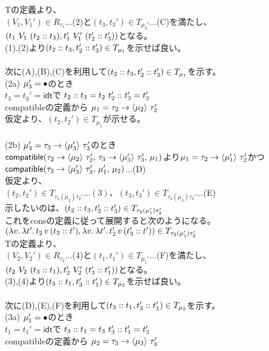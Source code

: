 Tの定義より、\\
$(V_1,V_1')\in R_{\tau_1}$...(2)と$(t_3,t_3')\in T_{\mu_3'}$...(C)を満たし、$(t_1\ V_1\ (\Cons{t_2}{t_3}),t_1'\ V_1'\ (\Cons{t_2'}{t_3'}))$となる。\\
(1),(2)より$(\Cons{t_2}{t_3},\Cons{t_2'}{t_3'})\in T_{\mu_1}$を示せば良い。\\
\\
次に(A),(B),(C)を利用して$(\Cons{t_2}{t_3},\Cons{t_2'}{t_3'})\in T_{\mu_1}$を示す。\\
(2a) $\mu_3'=\Bullet$のとき\\
$t_3=t_3'=\textsf{idt}$で $\Cons{t_2}{t_3}=t_2\ \Cons{t_2'}{t_3'}=t_2'$\\
\textsf{compatible}の定義から $\mu_1 = \Trail{\tau_2}{\tau_2'}{\mu_2}$\\
仮定より、$(t_2,t_2')\in T_{\mu_1}$が示せる。\\
\\
(2b) $\mu_3'=\Trail{\tau_3}{\tau_3'}{\mu_3'}$のとき\\
$\Compatible{\Trail{\tau_2}{\tau_2'}{\mu_2}}{\Trail{\tau_3}{\tau_3'}{\mu_3'}}{\mu_1}$より$\mu_1 = \Trail{\tau_2}{\tau_2'}{\mu_1'}$かつ$\Compatible{\Trail{\tau_3}{\tau_3'}{\mu_3'}}{\mu_1'}{\mu_2}$...(D)\\
仮定より、\\
$(t_2, t_2')\in T_{\tau_2(\mu_2)\tau_2'}...(3)、(t_3, t_3')\in T_{\tau_3(\mu_3)\tau_3'}$...(E)\\
示したいのは、$(\Cons{t_2}{t_3}, \Cons{t_2'}{t_3'})\in T_{\tau_2(\mu_1')\tau_2'}$\\これを\textsf{cons}の定義に従って展開すると次のようになる。\\
$(\Lam{v}{\Lam{t'}{t_2\,v\,(\Cons{t_3}{t'})}}, \Lam{v}{\Lam{t'}{t_2'\,v\,(\Cons{t_3'}{t'})}})\in T_{\tau_2(\mu_1')\tau_2'}$\\
Tの定義より、\\
$(V_2,V_2')\in R_{\tau_2}$...(4)と$(t_1,t_1')\in T_{\mu_1'}$...(F)を満たし、$(t_2\ V_2\ (\Cons{t_3}{t_1}),t_2'\ V_2'\ (\Cons{t_3'}{t_1'}))$となる。\\
(3),(4)より$(\Cons{t_3}{t_1},\Cons{t_3'}{t_1'})\in T_{\mu_2}$を示せば良い。\\
\\
次に(D),(E),(F)を利用して$(\Cons{t_3}{t_1},\Cons{t_3'}{t_1'})\in T_{\mu_2}$を示す。\\
(3a) $\mu_1'=\Bullet$のとき\\
$t_1=t_1'=\textsf{idt}$で $\Cons{t_3}{t_1}=t_3\ \Cons{t_3'}{t_1'}=t_3'$\\
\textsf{compatible}の定義から $\mu_2 = \Trail{\tau_3}{\tau_3'}{\mu_3}$\\
